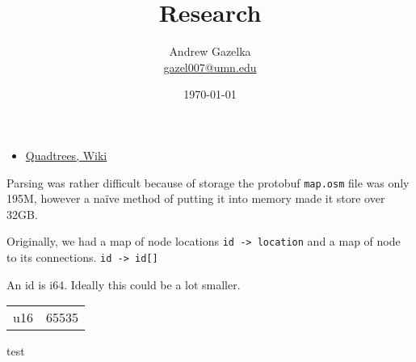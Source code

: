 \documentclass{article}
\title{Research}
\author{Andrew Gazelka\\ \url{gazel007@umn.edu}}
\date{\today}
\begin{document}
\maketitle

\begin{itemize}
    \item \href{https://en.wikipedia.org/wiki/Quadtree#:~:text=A%20quadtree%20is%20a%20tree,into%20four%20quadrants%20or%20regions.}{Quadtrees, Wiki}
\end{itemize}

Parsing was rather difficult because of storage the protobuf \verb|map.osm| file was only 195M, 
however a naïve method of putting it into memory made it store over 32GB. 

Originally, we had a map of node locations \verb|id -> location| and a map of node to its connections. \verb|id -> id[]|

An id is i64. Ideally this could be a lot smaller. 
\begin{center} 
    \begin{tabular}{cc} 
    u16 & 65535
    \end{tabular}
\end{center}
test


\end{document}
